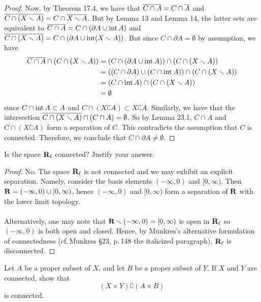 \begin{proof}
Now, by Theorem 17.4, we have that $\overline{C\cap A}=C\cap\overline{A}$
and $\overline{C\cap(X\smallsetminus A)}=C\cap\overline{X\smallsetminus
  A}$. But by Lemma 13 and Lemma 14, the latter sets are
equivalent to $\overline{C\cap A}=C\cap(\partial A\cup\operatorname{int}
  A)$ and $\overline{C\cap(X\smallsetminus
    A)}=C\cap(\partial A\cup\operatorname{int}(X\smallsetminus
    A))$. But since $C\cap\partial A=\emptyset$ by
assumption, we have
\begin{align*}
\overline{C\cap A}\cap(C\cap(X\smallsetminus A))
&=(C\cap(\partial A\cup\operatorname{int} A))
\cap(C\cap(X\smallsetminus A))\\
&=((C\cap\partial A)
\cup
(C\cap\operatorname{int} A))
\cap
(C\cap(X\smallsetminus A))\\
&=(C\cap\operatorname{int} A)\cap(C\cap(X\smallsetminus A))\\
&=\emptyset
\end{align*}
since $C\cap\operatorname{int} A\subset A$ and $C\cap(X\complement
  A)\subset X\complement A$. Similarly, we have that the intersection
$\overline{C\cap(X\smallsetminus A)}\cap(C\cap
  A)=\emptyset$. So by Lemma 23.1, $C\cap A$ and
$C\cap(X\complement A)$ form a separation of $C$. This
contradicts the assumption that $C$ is connected. Therefore, we
conclude that $C\cap\partial A\neq\emptyset$.
\end{proof}
\newpage
\begin{problem}[Munkres \S23, Ex.\,7]
Is the space $\mathbf{R}_\ell$ connected? Justify your answer.
\end{problem}
\begin{proof}
No. The space $\mathbf{R}_\ell$ is not connected and we may exhibit an
explicit separation. Namely, consider the basis elements
$(-\infty,0)$ and $[0,\infty)$. Then
$\mathbf{R}=(-\infty,0)\cup[0,\infty)$, hence $(-\infty,0)$ and
$[0,\infty)$ form a separation of $\mathbf{R}$ with the lower limit
topology.
\\\\
Alternatively, one may note that
$\mathbf{R}\smallsetminus(-\infty,0)=[0,\infty)$ is open in $\mathbf{R}_\ell$ so
$(-\infty,0)$ is both open and closed. Hence, by Munkres's
alternative formulation of connectedness (cf.\,Munkres \S23,
p.\,148 the italicized paragraph), $\mathbf{R}_\ell$ is disconnected.
\end{proof}
\newpage
\begin{problem}[Munkres \S23, Ex.\,9]
Let $A$ be a proper subset of $X$, and let $B$ be a proper subset
of $Y$. If $X$ and $Y$ are connected, show that
\[
(X\times Y)\complement(A\times B)
\]
is connected.
\end{problem}
